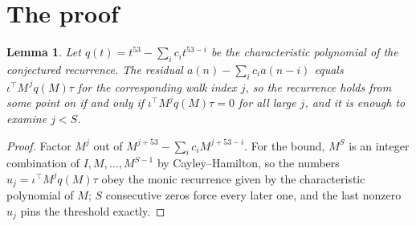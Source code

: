\documentclass[11pt,a4paper]{article}
\theoremstyle{plain}
\newtheorem{lemma}[theorem]{Lemma}
\theoremstyle{definition}
\begin{document}
\section{The proof}

\begin{lemma}\label{lem:crit}
Let $q(t)=t^{53}-\sum_i c_it^{53-i}$ be the characteristic polynomial of the
conjectured recurrence. The residual $a(n)-\sum_ic_ia(n-i)$ equals
$\iota^{\!\top}M^{\,j}q(M)\tau$ for the corresponding walk index $j$, so the recurrence
holds from some point on if and only if $\iota^{\!\top}M^{j}q(M)\tau=0$ for all large $j$,
and it is enough to examine $j<S$.
\end{lemma}

\begin{proof}
Factor $M^{j}$ out of $M^{j+53}-\sum_ic_iM^{j+53-i}$. For the bound, $M^{S}$
is an integer combination of $I,M,\dots,M^{S-1}$ by Cayley--Hamilton, so the numbers
$u_j=\iota^{\!\top}M^{j}q(M)\tau$ obey the monic recurrence given by the characteristic
polynomial of $M$; $S$ consecutive zeros force every later one, and the last nonzero $u_j$
pins the threshold exactly.
\end{proof}
\end{document}
